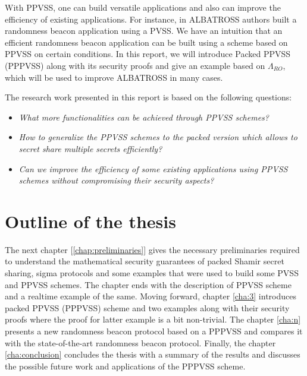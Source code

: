 With PPVSS, one can build versatile applications and also can improve the efficiency of existing 
applications. For instance, in ALBATROSS \cite{cryptoeprint:2020/644} authors built a randomness beacon application 
using a PVSS. We have an intuition that an efficient randomness beacon application can be built 
using a scheme based on PPVSS on certain conditions. In this report, we will introduce Packed PPVSS (PPPVSS) 
along with its security proofs and give an example based on $\Lambda_{RO}$, which will be used to improve 
ALBATROSS in many cases.\par

The research work presented in this report is based on the following questions:
\begin{itemize}
    \item \textit{What more functionalities can be achieved through PPVSS schemes?}
    \item \textit{How to generalize the PPVSS schemes to the packed version which allows to 
      secret share multiple secrets efficiently?}
    \item \textit{Can we improve the efficiency of some existing applications using PPVSS schemes
      without compromising their security aspects?}
\end{itemize}


\section*{Outline of the thesis}
The next chapter [\ref{chap:preliminaries}] gives the necessary preliminaries required 
to understand the mathematical security guarantees of packed Shamir secret sharing, sigma 
protocols and some examples that were used to build some PVSS and PPVSS schemes. The chapter 
ends with the description of PPVSS scheme and a realtime example of the same. Moving forward, 
chapter \ref{cha:3} introduces packed PPVSS (PPPVSS) scheme and two examples along with 
their security proofs where the proof for latter example is a bit non-trivial. The 
chapter \ref{cha:n} presents a new randomness beacon protocol based on a PPPVSS and 
compares it with the state-of-the-art randomness beacon protocol.
Finally, the chapter \ref{cha:conclusion} concludes the thesis with a summary of the 
results and discusses the possible future work and applications of the PPPVSS scheme.


